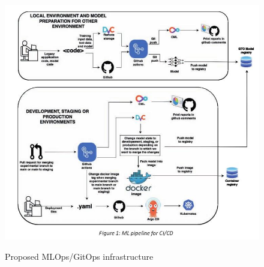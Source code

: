 \begin{figure}[!htbp]
    \caption{Proposed MLOps/GitOps infrastructure\cite{mlops-gitops}}
    \centering
    \includegraphics[scale=0.3]{images/mlops-gitops}
    \label{fig:mlops-gitops}
\end{figure}
